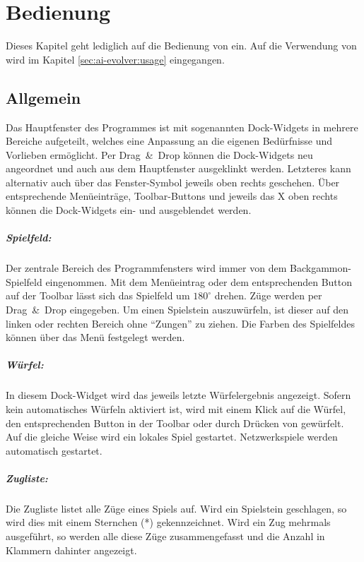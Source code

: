 \chapter{Bedienung}
Dieses Kapitel geht lediglich auf die Bedienung von  ein. Auf die Verwendung von  wird im Kapitel \ref{sec:ai-evolver:usage} eingegangen.

\section{Allgemein}
Das Hauptfenster des Programmes ist mit sogenannten Dock-Widgets in mehrere Bereiche aufgeteilt, welches eine Anpassung an die eigenen Bedürfnisse und Vorlieben ermöglicht. Per Drag~\&~Drop können die Dock-Widgets neu angeordnet und auch aus dem Hauptfenster ausgeklinkt werden. Letzteres kann alternativ auch über das Fenster-Symbol jeweils oben rechts geschehen. Über entsprechende Menüeinträge, Toolbar-Buttons und jeweils das X oben rechts können die Dock-Widgets ein- und ausgeblendet werden.

\paragraph*{Spielfeld:} Der zentrale Bereich des Programmfensters wird immer von dem Backgammon-Spielfeld eingenommen. Mit dem Menüeintrag  oder dem entsprechenden Button auf der Toolbar lässt sich das Spielfeld um $180^\circ$ drehen. Züge werden per Drag~\&~Drop eingegeben. Um einen Spielstein auszuwürfeln, ist dieser auf den linken oder rechten Bereich ohne "`Zungen"' zu ziehen. Die Farben des Spielfeldes können über das Menü  festgelegt werden.

\paragraph*{Würfel:} In diesem Dock-Widget wird das jeweils letzte Würfelergebnis angezeigt. Sofern kein automatisches Würfeln aktiviert ist, wird mit einem Klick auf die Würfel, den entsprechenden Button in der Toolbar oder durch Drücken von  gewürfelt. Auf die gleiche Weise wird ein lokales Spiel gestartet. Netzwerkspiele werden automatisch gestartet.

\paragraph*{Zugliste:} Die Zugliste listet alle Züge eines Spiels auf. Wird ein Spielstein geschlagen, so wird dies mit einem Sternchen (*) gekennzeichnet. Wird ein Zug mehrmals ausgeführt, so werden alle diese Züge zusammengefasst und die Anzahl in Klammern dahinter angezeigt.

